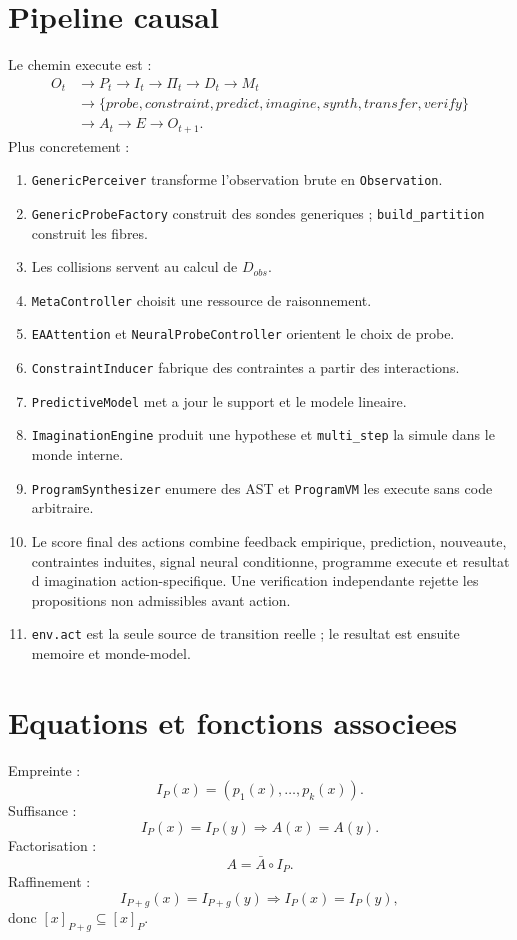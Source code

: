 \documentclass[11pt,a4paper]{article}
\begin{document}
\section{Pipeline causal}
Le chemin execute est :
\[
\begin{aligned}
O_t&\to P_t\to I_t\to\Pi_t\to D_t\to M_t\\
&\to\{probe,constraint,predict,imagine,synth,transfer,verify\}\\
&\to A_t\to E\to O_{t+1}.
\end{aligned}
\]
Plus concretement :
\begin{enumerate}
\item \texttt{GenericPerceiver} transforme l'observation brute en \texttt{Observation}.
\item \texttt{GenericProbeFactory} construit des sondes generiques ; \texttt{build\_partition} construit les fibres.
\item Les collisions servent au calcul de $D_{obs}$.
\item \texttt{MetaController} choisit une ressource de raisonnement.
\item \texttt{EAAttention} et \texttt{NeuralProbeController} orientent le choix de probe.
\item \texttt{ConstraintInducer} fabrique des contraintes a partir des interactions.
\item \texttt{PredictiveModel} met a jour le support et le modele lineaire.
\item \texttt{ImaginationEngine} produit une hypothese et \texttt{multi\_step} la simule dans le monde interne.
\item \texttt{ProgramSynthesizer} enumere des AST et \texttt{ProgramVM} les execute sans code arbitraire.
\item Le score final des actions combine feedback empirique, prediction, nouveaute, contraintes induites, signal neural conditionne, programme execute et resultat d imagination action-specifique. Une verification independante rejette les propositions non admissibles avant action.
\item \texttt{env.act} est la seule source de transition reelle ; le resultat est ensuite memoire et monde-model.
\end{enumerate}

\section{Equations et fonctions associees}
Empreinte :
\[
I_P(x)=(p_1(x),\ldots,p_k(x)).
\]
Suffisance :
\[
I_P(x)=I_P(y)\Rightarrow A(x)=A(y).
\]
Factorisation :
\[
A=\bar A\circ I_P.
\]
Raffinement :
\[
I_{P+g}(x)=I_{P+g}(y)\Rightarrow I_P(x)=I_P(y),
\]
donc $[x]_{P+g}\subseteq[x]_P$.
\end{document}

